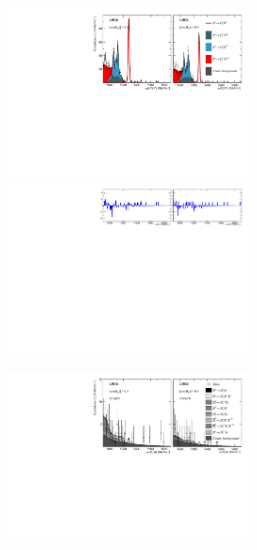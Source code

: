 \begin{figure}[!h]
    \centering
    \begin{subfigure}[t]{1.0\textwidth}
        \centering
        \includegraphics[width=0.7\textwidth]{figs/Appendix_FitCategories/canvas_DsD0_Ds2PiPiPi_both_summed_splitHel_splitKKPi_s21_s21r1_s24_s26.pdf}\\
        \includegraphics[width=0.7\textwidth]{figs/Appendix_FitCategories/residuals_DsD0_Ds2PiPiPi_both_summed_splitHel_splitKKPi_s21_s21r1_s24_s26.pdf}
    \end{subfigure}
    \begin{subfigure}[t]{1.0\textwidth}
        \centering
        \includegraphics[width=0.7\textwidth]{figs/Appendix_FitCategories/canvas_DsPhi_Ds2PiPiPi_both_summed_splitHel_splitKKPi_s21_s21r1_s24_s26.pdf}\\

\end{subfigure}
\end{figure}
